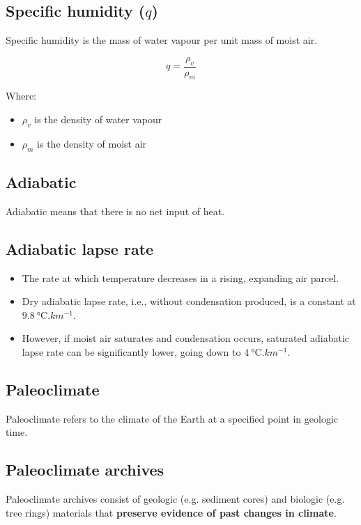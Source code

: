 \documentclass[11pt]{article}
\begin{document}
\subsection{Specific humidity (\(q\))}
\label{sec:orgf334e12}
Specific humidity is the mass of water vapour per unit mass of moist air.

\[q = \frac{\rho_v}{\rho_m}\]

Where:
\begin{itemize}
\item \(\rho_v\) is the density of water vapour
\item \(\rho_m\) is the density of moist air
\end{itemize}

\subsection{Adiabatic}
\label{sec:orgb806a81}
Adiabatic means that there is no net input of heat.

\subsection{Adiabatic lapse rate}
\label{sec:orgadf773a}
\begin{itemize}
\item The rate at which temperature decreases in a rising, expanding air parcel.
\item Dry adiabatic lapse rate, i.e., without condensation produced, is a constant at \(\qty{9.8}{\degreeCelsius.km^{-1}}\).
\item However, if moist air saturates and condensation occurs, saturated adiabatic lapse rate can be significantly lower, going down to \(\qty{4}{\degreeCelsius.km^{-1}}\).
\end{itemize}

\subsection{Paleoclimate}
\label{sec:orgbf9730f}
Paleoclimate refers to the climate of the Earth at a specified point in geologic time.

\subsection{Paleoclimate archives}
\label{sec:orgb9ae151}
Paleoclimate archives consist of geologic (e.g. sediment cores) and biologic (e.g. tree rings) materials that \textbf{preserve evidence of past changes in climate}.
\end{document}
